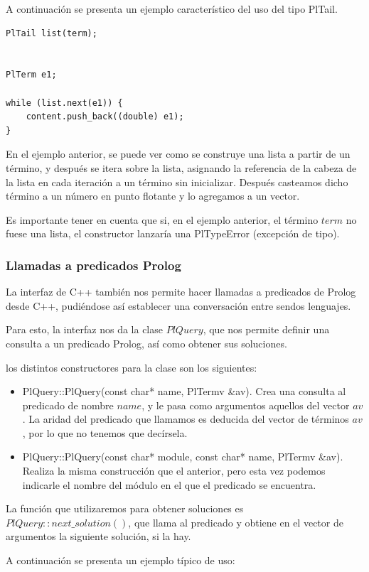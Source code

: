 \documentclass[a4paper,12pt]{article}
\begin{document}
A continuación se presenta un ejemplo característico del uso del tipo PlTail.

\begin{lstlisting}[style=C++]
PlTail list(term);


PlTerm e1;

while (list.next(e1)) {
	content.push_back((double) e1);
}
\end{lstlisting}

En el ejemplo anterior, se puede ver como se construye una lista a partir de un término, y después se itera sobre la lista, asignando la referencia de la cabeza de la lista en cada iteración a un término sin inicializar. Después casteamos dicho término a un número en punto flotante y lo agregamos a un vector. 

Es importante tener en cuenta que si, en el ejemplo anterior, el término $term$ no fuese una lista, el constructor lanzaría una PlTypeError (excepción de tipo).
\subsubsection{Llamadas a predicados Prolog}

La interfaz de C++ también nos permite hacer llamadas a predicados de Prolog desde C++, pudiéndose así establecer una conversación entre sendos lenguajes.

Para esto, la interfaz nos da la clase $PlQuery$, que nos permite definir una consulta a un predicado Prolog, así como obtener sus soluciones.

los distintos constructores para la clase son los siguientes:
\begin{itemize}
\item PlQuery::PlQuery(const char* name, PlTermv \&av). Crea una consulta al predicado de nombre $name$, y le pasa como argumentos aquellos del vector $av$. La aridad del predicado que llamamos es deducida del vector de términos $av$, por lo que no tenemos que decírsela.
\item PlQuery::PlQuery(const char* module, const char* name, PlTermv \&av). Realiza la misma construcción que el anterior, pero esta vez podemos indicarle el nombre del módulo en el que el predicado se encuentra.
\end{itemize}

La función que utilizaremos para obtener soluciones es $PlQuery::next\_solution()$, que llama al predicado y obtiene en el vector de argumentos la siguiente solución, si la hay.

A continuación se presenta un ejemplo típico de uso:
\end{document}
